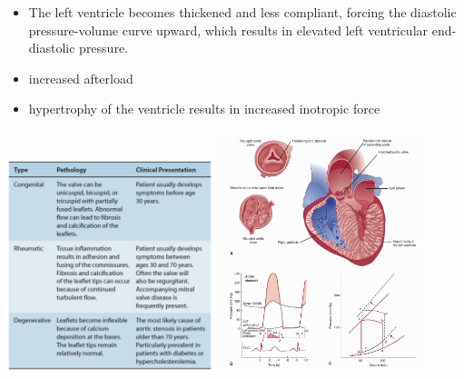 \documentclass[11pt]{article}
\begin{document}
\begin{itemize}
\begin{itemize}
\item  The left ventricle becomes thickened and less compliant, forcing the diastolic pressure-volume curve upward, which results in elevated left ventricular end-diastolic pressure. 
\item increased afterload
\item hypertrophy of the ventricle results in increased inotropic force
    \end{itemize}
\includegraphics[width=0.45\textwidth]{images/causes_of_aortic_stenosis.png}
\includegraphics[width=0.45\textwidth]{images/characteristics_of_aortic_stenosis.png}
\end{itemize}
\end{document}
